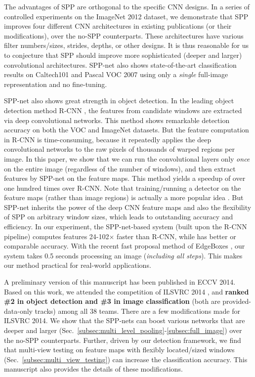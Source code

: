 \documentclass[10pt,journal,cspaper,compsoc]{IEEEtran}
\begin{document}
The advantages of SPP are orthogonal to the specific CNN designs. In a series of controlled experiments on the ImageNet 2012 dataset, we demonstrate that SPP improves four different CNN architectures in existing publications \cite{Krizhevsky2012,Zeiler2013,Sermanet2013} (or their modifications), over the no-SPP counterparts. These architectures have various filter numbers/sizes, strides, depths, or other designs.
It is thus reasonable for us to conjecture that SPP should improve more sophisticated (deeper and larger) convolutional architectures.
SPP-net also shows state-of-the-art classification results on Caltech101 \cite{Fei-Fei2007} and Pascal VOC 2007 \cite{Everingham2007} using only a \emph{single} full-image representation and no fine-tuning.

SPP-net also shows great strength in object detection.
In the leading object detection method R-CNN \cite{Girshick2014}, the features from candidate windows are extracted via deep convolutional networks. This method shows remarkable detection accuracy on both the VOC and ImageNet datasets. But the feature computation in R-CNN is time-consuming, because it repeatedly applies the deep convolutional networks to the raw pixels of thousands of warped regions per image. In this paper, we show that we can run the convolutional layers only \emph{once} on the entire image (regardless of the number of windows), and then extract features by SPP-net on the feature maps. This method yields a speedup of over one hundred times over R-CNN. Note that training/running a detector on the feature maps (rather than image regions) is actually a more popular idea \cite{Felzenszwalb2010,Dalal2005,Sande2011,Sermanet2013}.
But SPP-net inherits the power of the deep CNN feature maps and also the flexibility of SPP on arbitrary window sizes, which leads to outstanding accuracy and efficiency.
In our experiment, the SPP-net-based system (built upon the R-CNN pipeline) computes features 24-102$\times$ faster than R-CNN, while has better or comparable accuracy. With the recent fast proposal method of EdgeBoxes \cite{Zitnick2014}, our system takes 0.5 seconds processing an image (\emph{including all steps}). This makes our method practical for real-world applications.

A preliminary version of this manuscript has been published in ECCV 2014. Based on this work,
we attended the competition of ILSVRC 2014 \cite{Russakovsky2014},
and \textbf{ranked \#2 in object detection and \#3 in image classification} (both are provided-data-only tracks) among all 38 teams. There are a few modifications made for ILSVRC 2014. We show that the SPP-nets can boost various networks that are deeper and larger (Sec.~\ref{subsec:multi_level_pooling}-\ref{subsec:full_image}) over the no-SPP counterparts. Further, driven by our detection framework, we find that multi-view testing on feature maps with flexibly located/sized windows (Sec.~\ref{subsec:multi_view_testing}) can increase the classification accuracy. This manuscript also provides the details of these modifications.
\end{document}
